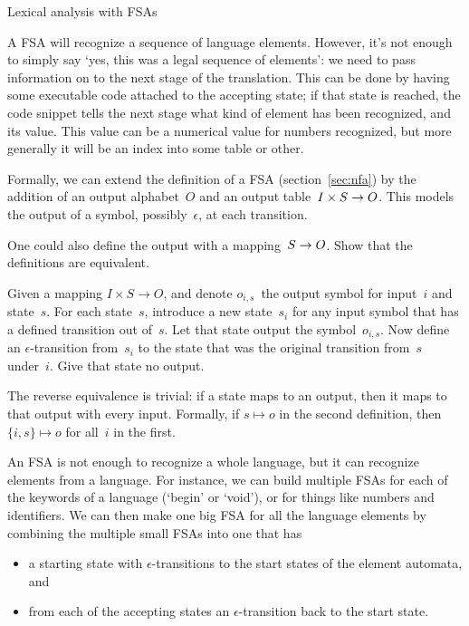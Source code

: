  {Lexical analysis with FSAs}

A FSA will recognize a sequence of language elements. However,
it's not enough to simply say `yes, this was a legal sequence of
elements': we need to pass information on to the next stage of the
translation. This can be done by having some executable code attached
to the accepting state; if that state is reached, the code snippet
tells the next stage what kind of element has been recognized, and its
value. This value can be a numerical value for numbers recognized, but
more generally it will be an index into some table or other.

Formally, we can extend the definition of a FSA
(section~\ref{sec:nfa}) by the addition of an output alphabet~$O$ and
an output table~$I\times S\rightarrow\nobreak O$. This models the
output of a symbol, possibly~$\epsilon$, at each transition.

\begin{594exercise}
One could also define the output with a mapping~$S\rightarrow\nobreak
O$. Show that the definitions are equivalent.
\end{594exercise}
\begin{answer}
Given a mapping $I\times S\rightarrow O$, and denote
$o_{i,s}$~the output symbol for input~$i$ and state~$s$.
For each state~$s$,
introduce a new state~$s_i$ for any input symbol that has a defined
transition out of~$s$. Let that state output the
symbol~$o_{i,s}$. Now define an $\epsilon$-transition
from~$s_i$ to the state that was the original transition from~$s$
under~$i$. Give that state no output.

The reverse equivalence is trivial: if a state maps to an output, then
it maps to that output with every input. Formally, if
$s\mapsto o$ in the second definition, then
$\{i,s\}\mapsto o$ for all~$i$ in the first.
\end{answer}

An FSA is not enough to recognize a whole language, but it can
recognize elements from a language. For instance, we can build
multiple FSAs for each of the keywords of a language (`begin' or
`void'), or for things like numbers and identifiers. We can then make
one big FSA for all the language elements by combining the multiple
small FSAs into one that has
\begin{itemize}
\item a starting state with $\epsilon$-transitions to the start states
  of the element automata, and
\item from each of the accepting states an $\epsilon$-transition back
  to the start state.
\end{itemize}


